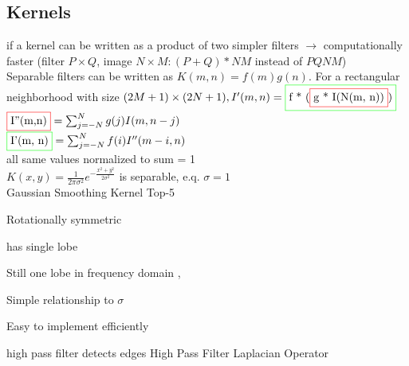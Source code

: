 \subsection*{Kernels}
 if a kernel can be written as a product of two simpler filters $\rightarrow$ computationally faster (filter $P \times Q$, image $N \times M: (P + Q) * NM$ instead of $PQNM$)\\
Separable filters can be written as \( K(m,n) = f(m)g(n) \).
For a rectangular neighborhood with size \((2M+1) \times (2N+1), I'(m, n) = \fcolorbox{green}{white}{f * (\fcolorbox{red}{white}{g * I(N(m, n))})}\)\\
$
\fcolorbox{red}{white}{I''(m,n)} = \sum_{j=-N}^{N} g(j) I(m, n - j)
$
\\
$\fcolorbox{green}{white}{I'(m, n)} = \sum_{j=-N}^{N} f(i) I''(m - i, n)$\\
 all same values normalized to sum = 1\\
 $K(x, y) = \frac{1}{2\pi \sigma^{2}} e^{-\frac{x^{2} + y^{2}}{2\sigma^{2}}}$ is separable, e.q. $\sigma = 1$\\
Gaussian Smoothing Kernel Top-5
\begin{compactitem}
\item Rotationally symmetric
\item has single lobe 
\item Still one lobe in frequency domain ,
\item Simple relationship to $\sigma$
\item Easy to implement efficiently
\end{compactitem}
high pass filter detects edges 
High Pass Filter Laplacian Operator \\


